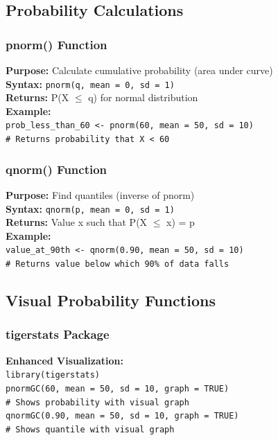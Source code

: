 \documentclass[11pt,a4paper]{article}
\begin{document}
\subsection{Probability Calculations}

\subsubsection{pnorm() Function}

\begin{formulabox}
\textbf{Purpose:} Calculate cumulative probability (area under curve)\\[0.3cm]
\textbf{Syntax:} \texttt{pnorm(q, mean = 0, sd = 1)}\\[0.3cm]
\textbf{Returns:} P(X $\leq$ q) for normal distribution\\[0.3cm]
\textbf{Example:}\\
\texttt{prob\_less\_than\_60 <- pnorm(60, mean = 50, sd = 10)}\\
\texttt{\# Returns probability that X < 60}
\end{formulabox}

\subsubsection{qnorm() Function}

\begin{formulabox}
\textbf{Purpose:} Find quantiles (inverse of pnorm)\\[0.3cm]
\textbf{Syntax:} \texttt{qnorm(p, mean = 0, sd = 1)}\\[0.3cm]
\textbf{Returns:} Value x such that P(X $\leq$ x) = p\\[0.3cm]
\textbf{Example:}\\
\texttt{value\_at\_90th <- qnorm(0.90, mean = 50, sd = 10)}\\
\texttt{\# Returns value below which 90\% of data falls}
\end{formulabox}

\subsection{Visual Probability Functions}

\subsubsection{tigerstats Package}

\begin{formulabox}
\textbf{Enhanced Visualization:}\\
\texttt{library(tigerstats)}\\[0.3cm]
\texttt{pnormGC(60, mean = 50, sd = 10, graph = TRUE)}\\
\texttt{\# Shows probability with visual graph}\\[0.3cm]
\texttt{qnormGC(0.90, mean = 50, sd = 10, graph = TRUE)}\\
\texttt{\# Shows quantile with visual graph}
\end{formulabox}
\end{document}

